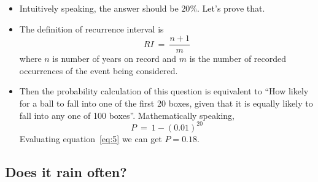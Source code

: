\documentclass[12pt]{article}
\begin{document}
\begin{itemize}
\item Intuitively speaking, the answer should be $20\%$. Let's prove
  that. 
\item The definition of recurrence interval is
  \begin{equation}
    \label{eq:4}
    RI~=~\frac{n+1}{m}
  \end{equation}
  where $n$ is number of years on record and $m$ is the number of
  recorded occurrences of the event being considered.
\item Then the probability calculation of this question is equivalent
  to ``How likely for a ball to fall into one of the first 20 boxes,
  given that it is equally likely to fall into any one of 100
  boxes''. Mathematically speaking,
  \begin{equation}
    \label{eq:5}
    P~=~1-(0.01)^{20}
  \end{equation}
  Evaluating equation~\eqref{eq:5} we can get $P=0.18$.
\end{itemize}

\subsection{Does it rain often?}
\label{sec:does-it-rain}
\end{document}
